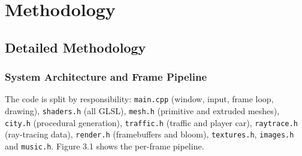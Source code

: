 \documentclass[12pt, a4paper]{report}
\begin{document}
\chapter{Methodology}

\section{Detailed Methodology}

\subsection{System Architecture and Frame Pipeline}

\begin{justify}
  {\fontsize{12}{13.8}\selectfont
    The code is split by responsibility: \texttt{main.cpp} (window, input, frame loop, drawing), \texttt{shaders.h} (all GLSL), \texttt{mesh.h} (primitive and extruded meshes), \texttt{city.h} (procedural generation), \texttt{traffic.h} (traffic and player car), \texttt{raytrace.h} (ray-tracing data), \texttt{render.h} (framebuffers and bloom), \texttt{textures.h}, \texttt{images.h} and \texttt{music.h}. Figure 3.1 shows the per-frame pipeline.
  }
\end{justify}
\end{document}
